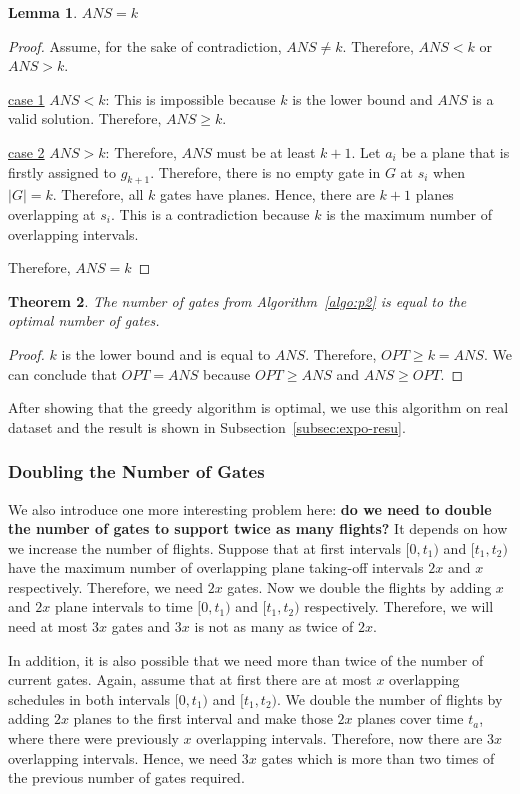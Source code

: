 \documentclass[11pt,a4paper]{article}
\newtheorem{theorem}{Theorem}[section]
\newtheorem{lemma}[theorem]{Lemma}
\begin{document}
\begin{lemma}
$ANS = k$
\end{lemma}
\begin{proof}
Assume, for the sake of contradiction, $ANS \neq k$. Therefore, $ANS < k$ or $ANS > k$. \par
\underline{case 1} $ANS < k$: This is impossible because $k$ is the lower bound and $ANS$ is a valid solution. Therefore, $ANS \geq k$. \par
\underline{case 2} $ANS > k$: Therefore, $ANS$ must be at least $k+1$. Let $a_i$ be a plane that is firstly assigned to $g_{k+1}$. Therefore, there is no empty gate in $G$ at $s_i$ when $|G| = k$. Therefore, all $k$ gates have planes. Hence, there are $k+1$ planes overlapping at $s_i$. This is a contradiction because $k$ is the maximum number of overlapping intervals. \par
Therefore, $ANS = k$
\end{proof}

\begin{theorem}
The number of gates from Algorithm~\ref{algo:p2} is equal to the optimal number of gates.
\end{theorem}
\begin{proof}
$k$ is the lower bound and is equal to $ANS$. Therefore, $OPT \geq k = ANS$. We can conclude that $OPT = ANS$ because $OPT \geq ANS$ and $ANS \geq OPT$.
\end{proof}

After showing that the greedy algorithm is optimal, we use this algorithm on real dataset and the result is shown in Subsection~\ref{subsec:expo-resu}. \par

\subsubsection{Doubling the Number of Gates}
We also introduce one more interesting problem here: \textbf{do we need to double the number of gates to support twice as many flights?} It depends on how we increase the number of flights. Suppose that at first intervals $[0, t_1)$ and $[t_1, t_2)$ have the maximum number of overlapping plane taking-off intervals $2x$ and $x$ respectively. Therefore, we need $2x$ gates. Now we double the flights by adding $x$ and $2x$ plane intervals to time $[0, t_1)$ and $[t_1, t_2)$ respectively. Therefore, we will need at most $3x$ gates and $3x$ is not as many as twice of $2x$. \par
In addition, it is also possible that we need more than twice of the number of current gates. Again, assume that at first there are at most $x$ overlapping schedules in both intervals $[0, t_1)$ and $[t_1, t_2)$. We double the number of flights by adding $2x$ planes to the first interval and make those $2x$ planes cover time $t_a$, where there were previously $x$ overlapping intervals. Therefore, now there are $3x$ overlapping intervals. Hence, we need $3x$ gates which is more than two times of the previous number of gates required.
\end{document}

